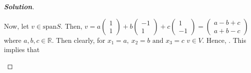 \documentclass[10pt]{scrartcl}
\theoremstyle{definition}
\newenvironment{solution} {\begin{proof}[\normalfont \textbf{Solution}]} {\end{proof}}
\newcommand{\rn}{\mathbb{R}}
\begin{document}
\begin{solution}
\begin{enumerate}[label={(\roman*)}]
        Now, let $v \in \text{span}S$. Then,
        $v = 
            a
            \begin{pmatrix}
                1 \\ 
                1 
            \end{pmatrix}
            +b
            \begin{pmatrix}
                -1 \\ 
                1
            \end{pmatrix}
            +c
            \begin{pmatrix}
                1 \\ 
                -1
            \end{pmatrix}
            =
            \begin{pmatrix}
                a - b + c \\ 
                a + b - c
            \end{pmatrix}
            $ where $a, b, c \in \rn$. Then clearly, for $x_1 = a,~x_2 = b \text{ and }x_3 = c$
            $v \in V$. Hence, . This implies that 
            

\end{enumerate}
\end{solution}
\end{document}
